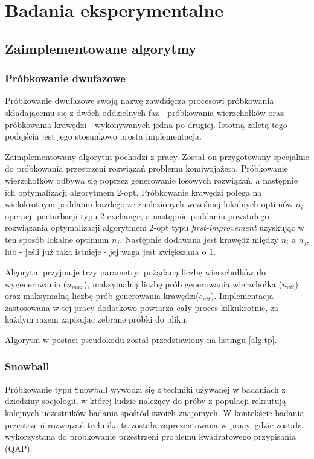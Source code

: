 \chapter{Badania eksperymentalne}

\section{Zaimplementowane algorytmy}
\subsection{Próbkowanie dwufazowe} \label{section:tp}
Próbkowanie dwufazowe swoją nazwę zawdzięcza procesowi próbkowania składającemu się z dwóch oddzielnych faz
- próbkowania wierzchołków oraz próbkowania krawędzi - wykonywanych jedna po drugiej.
Istotną zaletą tego podejścia jest jego stosunkowo prosta implementacja.

Zaimplementowany algorytm pochodzi z pracy\cite{DBLP:conf/depcos/BozejkoGNAB18}.
Został on przygotowany specjalnie do próbkowania przestrzeni rozwiązań problemu komiwojażera.
Próbkowanie wierzchołków odbywa się poprzez generowanie losowych rozwiązań, a następnie ich optymalizacji algorytmem 2-opt.
Próbkowanie krawędzi polega na wielokrotnym poddaniu każdego ze znalezionych wcześniej lokalnych optimów $n_i$ operacji perturbacji typu 2-exchange,
a następnie poddaniu powstałego rozwiązania optymalizacji algorytmem 2-opt typu \textit{first-improvement} uzyskując w ten sposób lokalne optimum $n_j$.
Następnie dodawana jest krawędź między $n_i$ a $n_j$, lub - jeśli już taka istnieje - jej waga jest zwiększana o 1.

Algorytm przyjmuje trzy parametry: pożądaną liczbę wierzchołków do wygenerowania ($n_{max}$), maksymalną liczbę prób generowania wierzchołka ($n_{att}$)
oraz maksymalną liczbę prób generowania krawędzi($e_{att}$).
Implementacja zastosowana w tej pracy dodatkowo powtarza cały proces kilkukrotnie, za każdym razem zapisując zebrane próbki do pliku.

Algorytm w postaci pseudokodu został przedstawiony na listingu \ref{alg:tp}.

\subsection{Snowball} \label{section:snowball}
Próbkowanie typu Snowball wywodzi się z techniki używanej w badaniach z dziedziny socjologii, w której ludzie należący do próby z populacji
rekrutują kolejnych uczestników badania spośród swoich znajomych.
W kontekście badania przestrzeni rozwiązań technika ta została zaprezentowana w pracy\cite{DBLP:conf/ppsn/VerelDOT18}, gdzie została wykorzystana
do próbkowanie przestrzeni problemu kwadratowego przypisania (QAP).

